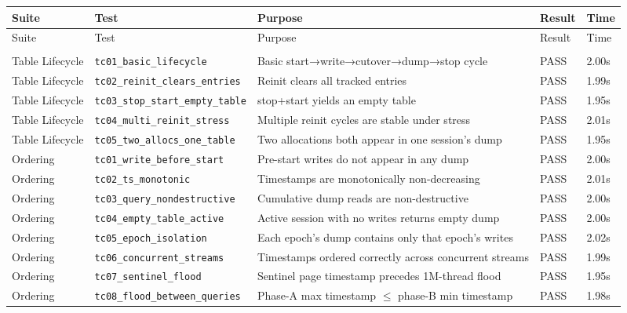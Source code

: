\begin{center}
\footnotesize
\begin{longtable}{>{\raggedright\arraybackslash}p{2.0cm} >{\raggedright\arraybackslash}p{4.5cm} >{\raggedright\arraybackslash}p{6.2cm} >{\raggedright\arraybackslash}p{1.0cm} >{\raggedright\arraybackslash}p{1.1cm}}
\toprule
Suite & Test & Purpose & Result & Time \\
\midrule
\endfirsthead
\toprule
Suite & Test & Purpose & Result & Time \\
\midrule
\endhead
\midrule
\multicolumn{5}{r}{Continued on next page} \\
\endfoot
\bottomrule
\endlastfoot

Table Lifecycle  & \texttt{tc01\_basic\_lifecycle} & Basic start→write→cutover→dump→stop cycle & PASS & 2.00s \\
Table Lifecycle  & \texttt{tc02\_reinit\_clears\_entries}   & Reinit clears all tracked entries & PASS & 1.99s \\
Table Lifecycle  & \texttt{tc03\_stop\_start\_empty\_table} & stop+start yields an empty table & PASS & 1.95s \\
Table Lifecycle  & \texttt{tc04\_multi\_reinit\_stress} & Multiple reinit cycles are stable under stress & PASS & 2.01s \\
Table Lifecycle  & \texttt{tc05\_two\_allocs\_one\_table} & Two allocations both appear in one session's dump & PASS & 1.95s \\
\midrule

Ordering & \texttt{tc01\_write\_before\_start} & Pre-start writes do not appear in any dump & PASS & 2.00s \\
Ordering & \texttt{tc02\_ts\_monotonic} & Timestamps are monotonically non-decreasing & PASS & 2.01s \\
Ordering & \texttt{tc03\_query\_nondestructive} & Cumulative dump reads are non-destructive & PASS & 2.00s \\
Ordering & \texttt{tc04\_empty\_table\_active} & Active session with no writes returns empty dump & PASS & 2.00s \\
Ordering & \texttt{tc05\_epoch\_isolation} & Each epoch's dump contains only that epoch's writes & PASS & 2.02s \\
Ordering & \texttt{tc06\_concurrent\_streams} & Timestamps ordered correctly across concurrent streams & PASS & 1.99s \\
Ordering & \texttt{tc07\_sentinel\_flood} & Sentinel page timestamp precedes 1M-thread flood & PASS & 1.95s \\
Ordering & \texttt{tc08\_flood\_between\_queries} & Phase-A max timestamp $\leq$ phase-B min timestamp & PASS & 1.98s \\
\midrule


\end{longtable}
\end{center}

